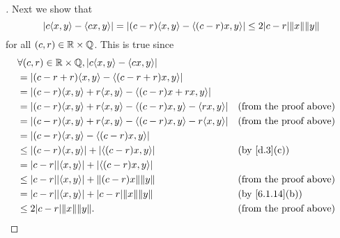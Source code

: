 \begin{proof}[]
  Next we show that
  \[
    \abs{c \inn{x, y} - \inn{cx, y}} = \abs{(c - r) \inn{x, y} - \inn{(c - r) x, y}} \leq 2 \abs{c - r} \norm{x} \norm{y}
  \]
  for all \((c, r) \in \mathbb{R} \times \mathbb{Q}\).
  This is true since
  \begin{align*}
     & \forall (c, r) \in \R \times \Q, \abs{c \inn{x, y} - \inn{cx, y}}                                               \\
     & = \abs{(c - r + r) \inn{x, y} - \inn{(c - r + r) x, y}}                                                         \\
     & = \abs{(c - r) \inn{x, y} + r \inn{x, y} - \inn{(c - r)x + rx, y}}                                              \\
     & = \abs{(c - r) \inn{x, y} + r \inn{x, y} - \inn{(c - r)x, y} - \inn{rx, y}}  &  & \text{(from the proof above)} \\
     & = \abs{(c - r) \inn{x, y} + r \inn{x, y} - \inn{(c - r)x, y} - r \inn{x, y}} &  & \text{(from the proof above)} \\
     & = \abs{(c - r) \inn{x, y} - \inn{(c - r) x, y}}                                                                 \\
     & \leq \abs{(c - r) \inn{x, y}} + \abs{\inn{(c - r) x, y}}                     &  & \text{(by \cref{d.3}(c))}     \\
     & = \abs{c - r} \abs{\inn{x, y}} + \abs{\inn{(c - r) x, y}}                                                       \\
     & \leq \abs{c - r} \abs{\inn{x, y}} + \norm{(c - r) x} \norm{y}                &  & \text{(from the proof above)} \\
     & = \abs{c - r} \abs{\inn{x, y}} + \abs{c - r} \norm{x} \norm{y}               &  & \text{(by \cref{6.1.14}(b))}  \\
     & \leq 2 \abs{c - r} \norm{x} \norm{y}.                                        &  & \text{(from the proof above)}
  \end{align*}


\end{proof}
